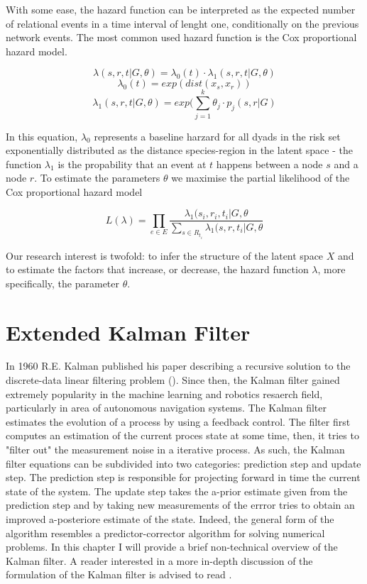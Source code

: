 \documentclass[mscthesis]{usiinfthesis}
\begin{document}
With some ease, the hazard function can be interpreted as the expected number of relational events in a time interval of lenght one, conditionally on the previous network events. The most common used hazard function is the Cox proportional hazard model. 


\[
\lambda(s, r, t|G, \theta) = \lambda_0(t) \cdot \lambda_1(s, r, t|G, \theta)
\]
\[
\lambda_0(t) =  exp(dist(x_s, x_r))
\]
\[
\lambda_1(s, r, t|G, \theta) = exp(\sum_{j=1}^k \theta_j \cdot p_j(s, r|G)
\]

In this equation, $\lambda_0$ represents a baseline harzard for all dyads in the risk set exponentially distributed as the distance species-region in the latent space - the function $\lambda_1$ is the propability that an event at $t$ happens between a node $s$ and a node $r$. To estimate the parameters $\theta$ we maximise the partial likelihood of the Cox proportional hazard model 

\[
L(\lambda) =  \prod_{e \in E} \frac{\lambda_1(s_i, r_i, t_i | G, \theta}{ \sum_{s \in R_{t_i}} \lambda_1(s, r, t_i | G, \theta}
\]

Our research interest is twofold: to infer the structure of the latent space $X$ and to estimate the factors that increase, or decrease, the hazard function $\lambda$, more specifically, the parameter $\theta$.


\section{Extended Kalman Filter}

In 1960 R.E. Kalman published his paper describing a recursive solution to the discrete-data linear filtering problem (\citet{paper:kalmanfilter}). Since then, the Kalman filter gained extremely popularity in the machine learning and robotics resaerch field, particularly in area of autonomous navigation systems. The Kalman filter estimates the evolution of a process by using a feedback control. The filter first computes an estimation of the current proces state at some time, then, it tries to "filter out" the measurement  noise in a iterative process. As such, the Kalman filter equations can be subdivided into two categories: prediction step and update step. The prediction step is responsible for projecting forward in time the current state of the system. The update step takes the a-prior estimate given from the prediction step and by taking new measurements of the errror tries to obtain an improved a-posteriore estimate of the state. Indeed, the general form of the algorithm resembles a predictor-corrector algorithm for solving numerical problems. In this chapter I will provide a brief non-technical overview of the Kalman filter. A reader interested in a more in-depth discussion of the formulation of the Kalman filter is advised to read \citet{paper:Maybeck79}.
\end{document}
